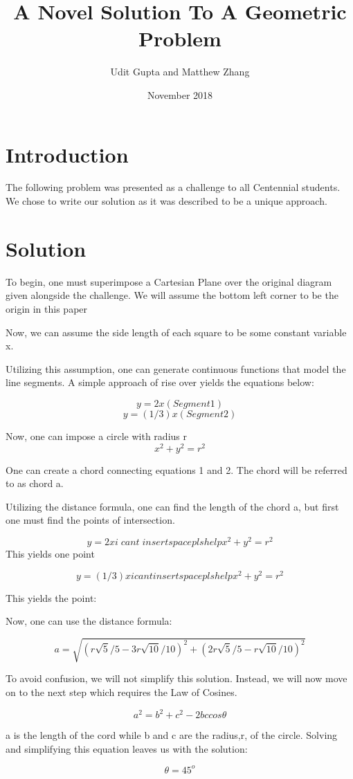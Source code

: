 \documentclass{article}
\title{A Novel Solution To A Geometric Problem}
\author{Udit Gupta and Matthew Zhang}
\date{November 2018}
\begin{document}
\maketitle


\section*{Introduction}
The following problem was presented as a challenge to all Centennial students. We chose to write our solution as it was described to be a unique approach.

\section*{Solution}
To begin, one must superimpose a Cartesian Plane over the original diagram given alongside the challenge. We will assume the bottom left corner to be the origin in this paper

Now, we can assume the side length of each square to be some constant variable x.
 
Utilizing this assumption, one can generate continuous functions that model the line segments. A simple approach of rise over yields the equations below:
 
 $$ y=2x          (Segment 1) $$
 $$  y=(1/3)x (Segment 2)$$
 
 Now, one can impose a circle with radius r $$x^2+y^2=r^2$$
 
 One can create a chord connecting equations 1 and 2. The chord will be referred to as chord a. 
 
 Utilizing the distance formula, one can find the length of the chord a, but first one must find the points of intersection. 
 
 $$ y=2x i\;cant\;insert space pls help x^2+y^2=r^2$$
This yields one point %

$$ y=(1/3)x i cant insert space pls help x^2+y^2=r^2$$



This yields the point: %

Now, one can use the distance formula:

$$ a=\sqrt{(r\sqrt{5}/5-3r\sqrt{10}/10)^2 + (2r\sqrt{5}/5-r\sqrt{10}/10)^2}$$


To avoid confusion, we will not simplify this solution. Instead, we will now move on to the next step which requires the Law of Cosines.

$$ a^2=b^2+c^2-2bccos\theta$$

a is the length of the cord while b and c are the radius,r, of the circle. Solving and simplifying this equation leaves us with the solution:

$$\theta=45^o$$
\end{document}
